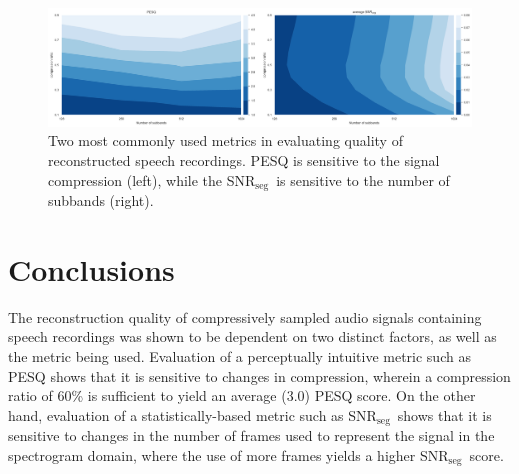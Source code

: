 \documentclass[10pt,a4paper,twoside]{article}
\newcommand{\snrseg}{SNR$_{\mathrm{seg}}$}
\begin{document}
\begin{figure}[tb]
	\centering
	\includegraphics[width=\textwidth]{metrics.png}
	\caption{Two most commonly used metrics in evaluating quality of reconstructed speech recordings. PESQ is sensitive to the signal compression (left), while the \snrseg~is sensitive to the number of subbands (right).}
	\label{fig:pesq-snr}
\end{figure}


\section{Conclusions}
The reconstruction quality of compressively sampled audio signals containing speech recordings was shown to be dependent on two distinct factors, as well as the metric being used. Evaluation of a perceptually intuitive metric such as PESQ shows that it is sensitive to changes in compression, wherein a compression ratio of 60\% is sufficient to yield an average (3.0) PESQ score. On the other hand, evaluation of a statistically-based metric such as \snrseg~shows that it is sensitive to changes in the number of frames used to represent the signal in the spectrogram domain, where the use of more frames yields a higher \snrseg~score.




\end{document}
